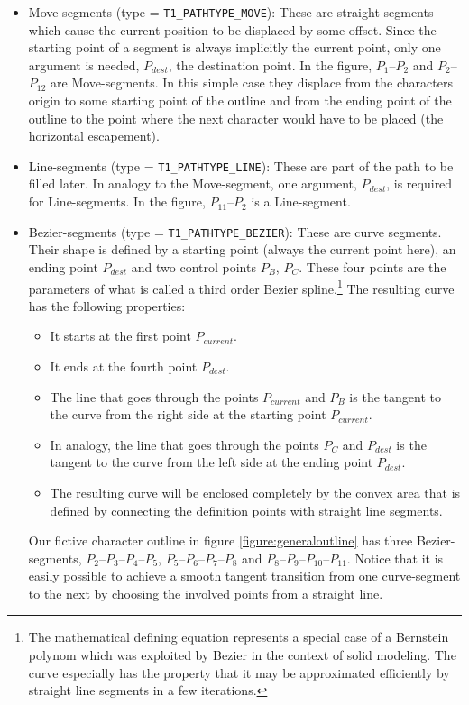 \begin{itemize}
\item Move-segments (type = \verb+T1_PATHTYPE_MOVE+): These are straight
  segments which cause the current position to be displaced by some offset.
  Since the starting point of a segment is always implicitly the current
  point, only one argument is needed, $P_{dest}$, the destination point. In
  the figure, $P_1$--$P_2$ and $P_{2}$--$P_{12}$ are Move-segments. In this
  simple case they displace from the characters origin to some starting point
  of the outline and from the ending point of the outline to the point where
  the next character would have to be placed (the horizontal escapement). 
\item Line-segments (type = \verb+T1_PATHTYPE_LINE+): These are part of the
  path to be filled later. In analogy to the Move-segment, one argument,
  $P_{dest}$, is required for Line-segments. In the figure, $P_{11}$--$P_2$ is
  a Line-segment.
\item Bezier-segments (type = \verb+T1_PATHTYPE_BEZIER+): These are curve
  segments. Their shape is defined by a starting point (always the current
  point here), an ending point $P_{dest}$ and two control points $P_B$,
  $P_C$. These four points are the parameters of what is called a third order
  Bezier spline.\footnote{The mathematical defining equation represents a
    special case of a Bernstein polynom which was exploited by {\sc Bezier} in
    the context of solid modeling. The curve especially has the property that
    it may be approximated efficiently by straight line segments in a few
    iterations.} The resulting curve has the following 
  properties:
  \begin{itemize}
  \item It starts at the first point $P_{current}$.
  \item It ends at the fourth point $P_{dest}$.
  \item The line that goes through the points $P_{current}$ and $P_{B}$ is the
    tangent to the curve from the right side at the starting point $P_{current}$.
  \item In analogy, the line that goes through the points $P_{C}$ and
    $P_{dest}$ is the tangent to the curve from the left side at the ending
    point $P_{dest}$.
  \item The resulting curve will be enclosed completely by the convex area
    that is defined by connecting the definition points with straight line
    segments.
  \end{itemize}
  Our fictive character outline in figure \ref{figure:generaloutline}
  has three Bezier-segments, $P_{2}$--$P_{3}$--$P_{4}$--$P_{5}$,
  $P_{5}$--$P_{6}$--$P_{7}$--$P_{8}$ and
  $P_{8}$--$P_{9}$--$P_{10}$--$P_{11}$. Notice that it is easily possible to
  achieve a smooth tangent transition from one curve-segment to the next by
  choosing the involved points from a straight line.
\end{itemize}
